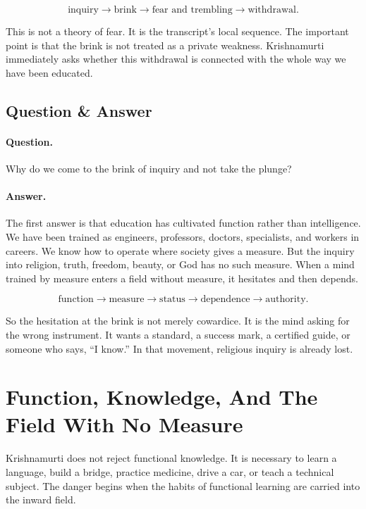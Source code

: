 \documentclass[11pt,oneside]{book}
\begin{document}
\begin{equation}
\text{inquiry}
\longrightarrow
\text{brink}
\longrightarrow
\text{fear and trembling}
\longrightarrow
\text{withdrawal}.
\end{equation}

This is not a theory of fear. It is the transcript's local sequence. The important point is that the brink is not treated as a private weakness. Krishnamurti immediately asks whether this withdrawal is connected with the whole way we have been educated.

\subsection{Question \& Answer}

\paragraph{Question.}
Why do we come to the brink of inquiry and not take the plunge?

\paragraph{Answer.}
The first answer is that education has cultivated function rather than intelligence. We have been trained as engineers, professors, doctors, specialists, and workers in careers. We know how to operate where society gives a measure. But the inquiry into religion, truth, freedom, beauty, or God has no such measure. When a mind trained by measure enters a field without measure, it hesitates and then depends.

\begin{equation}
\text{function}
\longrightarrow
\text{measure}
\longrightarrow
\text{status}
\longrightarrow
\text{dependence}
\longrightarrow
\text{authority}.
\end{equation}

So the hesitation at the brink is not merely cowardice. It is the mind asking for the wrong instrument. It wants a standard, a success mark, a certified guide, or someone who says, ``I know.'' In that movement, religious inquiry is already lost.

\section{Function, Knowledge, And The Field With No Measure}

Krishnamurti does not reject functional knowledge. It is necessary to learn a language, build a bridge, practice medicine, drive a car, or teach a technical subject. The danger begins when the habits of functional learning are carried into the inward field.
\end{document}
